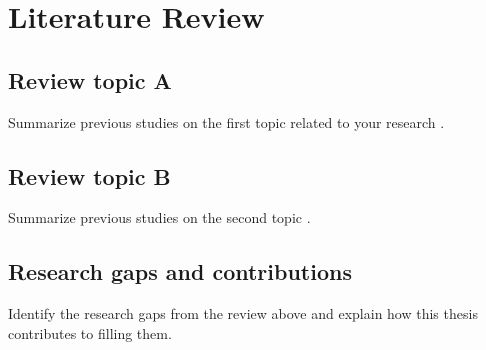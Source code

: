 \chapter{Literature Review} \label{chapter2}

\section{Review topic A} \label{chap2:sec1}

Summarize previous studies on the first topic related to your research \cite{RN35}.

\section{Review topic B} \label{chap2:sec2}

Summarize previous studies on the second topic \cite{zhou_unet_2018}.

\section{Research gaps and contributions} \label{chap2:sec3}

Identify the research gaps from the review above and explain how this thesis contributes to filling them.
